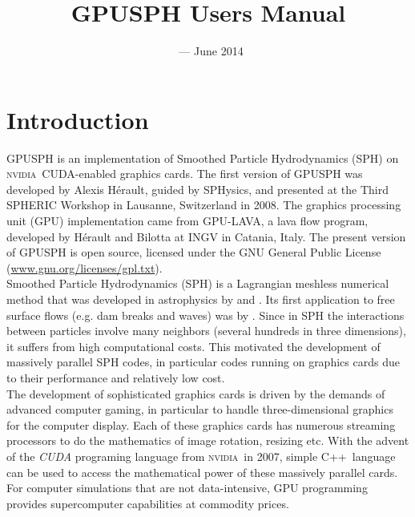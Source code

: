 \documentclass[12pt]{memoir}
\title{GPUSPH Users Manual}
\author{}
\date{\currentver\ --- June 2014}
\newcommand{\nvidia}{\textsc{nvidia}}
\newcommand{\cpp}{{\sffamily C\ttfamily++}}
\begin{document}
\maketitle
\tableofcontents

\chapter{Introduction}

GPUSPH is an implementation of Smoothed Particle Hydrodynamics (SPH) on
\nvidia\ CUDA-enabled graphics cards. The first version of GPUSPH was
developed by Alexis Hérault, guided by SPHysics, and presented at the
Third SPHERIC Workshop in Lausanne, Switzerland in 2008. 
The graphics processing unit (GPU) implementation came from GPU-LAVA, 
a lava flow program, developed by Hérault and Bilotta at INGV in 
Catania, Italy. The present version of GPUSPH is open source, 
licensed under the GNU General Public License
(\url{www.gnu.org/licenses/gpl.txt}). \\

Smoothed Particle Hydrodynamics (SPH) is a Lagrangian meshless numerical
method that was developed in astrophysics by \cite{lucy_numerical_1977} and
\cite{gingold_smoothed_1977}. Its first application to free surface flows (e.g.
dam breaks and waves) was by \cite{monaghan_volcanoes_1994}.
Since in SPH the interactions between particles involve many neighbors
(several hundreds in three dimensions), it suffers from high computational costs.
This motivated the development of massively parallel SPH codes,
in particular codes running on graphics cards due to their performance and relatively
low cost.\\

The development of sophisticated graphics cards is driven by the demands of 
advanced computer gaming, in particular to handle three-dimensional 
graphics for the computer display. Each of these
graphics cards has numerous streaming processors to do the mathematics
of image rotation, resizing etc. With the advent of the {\em CUDA}
programing language from \nvidia\ in 2007, simple \cpp\ language can be used
to access the mathematical power of these massively parallel cards. For
computer simulations that are not data-intensive, GPU programming
provides supercomputer capabilities at commodity prices.\\
\end{document}
